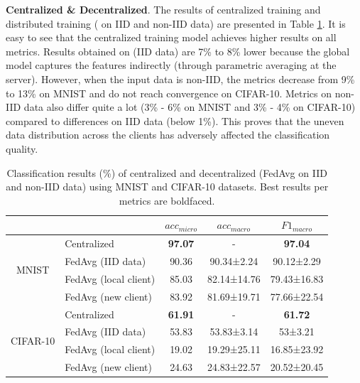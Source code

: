 \documentclass[runningheads]{llncs}
\begin{document}
\textbf{Centralized \& Decentralized}. The results of centralized training and distributed training ( on IID and non-IID data) are presented in Table \ref{fig:central_decentral}. It is easy to see that the centralized training model achieves higher results on all metrics. Results obtained on  (IID data) are 7\% to 8\% lower because the global model captures the features indirectly (through parametric averaging at the server). However, when the input data is non-IID, the metrics decrease from 9\% to 13\% on MNIST and do not reach convergence on CIFAR-10. Metrics on non-IID data also differ quite a lot (3\% - 6\% on MNIST and 3\% - 4\% on CIFAR-10) compared to differences on IID data (below 1\%). This proves that the uneven data distribution across the clients has adversely affected the classification quality.

\begin{table}[h]
    \centering
    \caption{Classification results (\%) of centralized and decentralized (FedAvg on IID and non-IID data) using MNIST and CIFAR-10 datasets. Best results per metrics are boldfaced.}
    \label{fig:central_decentral}
    \begin{tabular}{c|l|ccc} 
    \toprule
    \multicolumn{1}{c}{}      &                       & $acc_{micro}$  & $acc_{macro}$ & $F1_{macro}$    \\ 
    \hline
    \multirow{4}{*}{MNIST}    & Centralized           & \textbf{97.07} & -             & \textbf{97.04}  \\
                              & FedAvg (IID data)     & 90.36          & 90.34±2.24    & 90.12±2.29      \\
                              & FedAvg (local client) & 85.03          & 82.14±14.76   & 79.43±16.83     \\
                              & FedAvg (new client)   & 83.92          & 81.69±19.71   & 77.66±22.54     \\ 
    \hline
    \multirow{4}{*}{CIFAR-10} & Centralized           & \textbf{61.91} & -             & \textbf{61.72}  \\
                              & FedAvg (IID data)     & 53.83          & 53.83±3.14    & 53±3.21         \\
                              & FedAvg (local client) & 19.02          & 19.29±25.11   & 16.85±23.92     \\
                              & FedAvg (new client)   & 24.63          & 24.83±22.57   & 20.52±20.45     \\
    \bottomrule
    \end{tabular}
\end{table}
\end{document}
